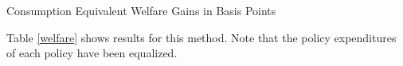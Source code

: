 \begin{table} 
	\center
	
	\caption{Consumption Equivalent Welfare Gains in Basis Points }
	\label{welfare}
\end{table}

Table \ref{welfare} shows results for this method. Note that the policy expenditures of each policy have been equalized.